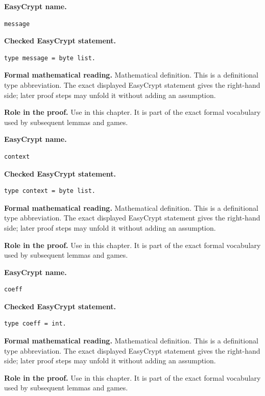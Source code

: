 \begin{formaldefinition}
\noindent\textbf{EasyCrypt name.}
\begin{lstlisting}[language=EasyCrypt,basicstyle=\ttfamily\scriptsize]
message
\end{lstlisting}
\noindent\textbf{Checked EasyCrypt statement.}
\begin{lstlisting}[language=EasyCrypt,basicstyle=\ttfamily\scriptsize]
type message = byte list.
\end{lstlisting}
\noindent\textbf{Formal mathematical reading.}
Mathematical definition. This is a definitional type abbreviation.  The exact displayed EasyCrypt statement gives the right-hand side; later proof steps may unfold it without adding an assumption.

\noindent\textbf{Role in the proof.}
Use in this chapter. It is part of the exact formal vocabulary used by subsequent lemmas and games.

\end{formaldefinition}

\begin{formaldefinition}
\noindent\textbf{EasyCrypt name.}
\begin{lstlisting}[language=EasyCrypt,basicstyle=\ttfamily\scriptsize]
context
\end{lstlisting}
\noindent\textbf{Checked EasyCrypt statement.}
\begin{lstlisting}[language=EasyCrypt,basicstyle=\ttfamily\scriptsize]
type context = byte list.
\end{lstlisting}
\noindent\textbf{Formal mathematical reading.}
Mathematical definition. This is a definitional type abbreviation.  The exact displayed EasyCrypt statement gives the right-hand side; later proof steps may unfold it without adding an assumption.

\noindent\textbf{Role in the proof.}
Use in this chapter. It is part of the exact formal vocabulary used by subsequent lemmas and games.

\end{formaldefinition}

\begin{formaldefinition}
\noindent\textbf{EasyCrypt name.}
\begin{lstlisting}[language=EasyCrypt,basicstyle=\ttfamily\scriptsize]
coeff
\end{lstlisting}
\noindent\textbf{Checked EasyCrypt statement.}
\begin{lstlisting}[language=EasyCrypt,basicstyle=\ttfamily\scriptsize]
type coeff = int.
\end{lstlisting}
\noindent\textbf{Formal mathematical reading.}
Mathematical definition. This is a definitional type abbreviation.  The exact displayed EasyCrypt statement gives the right-hand side; later proof steps may unfold it without adding an assumption.

\noindent\textbf{Role in the proof.}
Use in this chapter. It is part of the exact formal vocabulary used by subsequent lemmas and games.

\end{formaldefinition}

